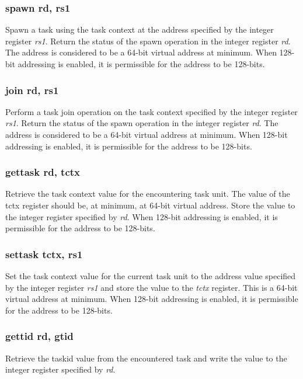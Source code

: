 \documentclass{article}
\begin{document}
\subsubsection{spawn rd, rs1}

Spawn a task using the task context at the address specified by the integer 
register \emph{rs1}.  Return the status of the spawn operation in the 
integer register \emph{rd}.  The address is considered to be a 64-bit virtual 
address at minimum.  When 128-bit addressing is enabled, it is permissible 
for the address to be 128-bits.  

\subsubsection{join rd, rs1}

Perform a task join operation on the task context specified 
by the integer register \emph{rs1}.  Return the status of the spawn operation
in the integer register \emph{rd}.  The address is considered to be a
64-bit virtual address at minimum.  When 128-bit addressing is enabled, it is
permissible for the address to be 128-bits. 

\subsubsection{gettask rd, tctx}

Retrieve the task context value for the encountering task unit.  
The value of the tctx register should be, at minimum, at 64-bit virtual
address.  Store the value to the integer register specified by \emph{rd}.  
When 128-bit addressing is enabled, it is permissible for the address to be 128-bits.

\subsubsection{settask tctx, rs1}

Set the task context value for the current task unit to the address value
specified by the integer register \emph{rs1} and store the value to the
\emph{tctx} register.  This is a 64-bit virtual address at minimum.  
When 128-bit addressing is enabled, it is permissible for the address to be 128-bits.


\subsubsection{gettid rd, gtid}

Retrieve the taskid value from the encountered task and write the value
to the integer register specified by \emph{rd}.
\end{document}

